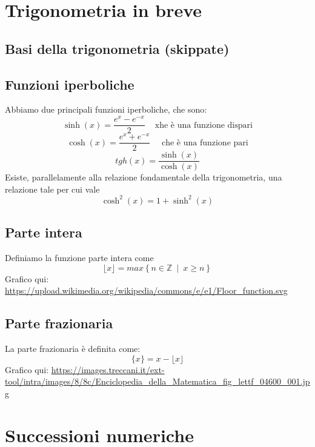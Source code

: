 \documentclass{article}
\theoremstyle{definition}
\begin{document}
\section{Trigonometria in breve}
\subsection{Basi della trigonometria (skippate)}
\subsection{Funzioni iperboliche}
Abbiamo due principali funzioni iperboliche, che sono:
\begin{equation}
    \sinh(x)=\frac{e^x-e^{-x}}{2} \,\,\,\,\,\,\, \mbox{xhe è una funzione dispari}
\end{equation}
\begin{equation}
    \cosh(x)=\frac{e^x+e^{-x}}{2}\,\,\,\,\,\,\,\, \mbox{che è una funzione pari}
\end{equation}
\begin{equation}
    tgh(x)=\frac{\sinh(x)}{\cosh(x)}
\end{equation}
Esiste, parallelamente alla relazione fondamentale della trigonometria, una relazione tale per cui vale
\begin{equation}
    \cosh^2(x)=1+\sinh^2(x)
\end{equation}
\subsection{Parte intera}
Definiamo la funzione parte intera come
\begin{equation}
    \lfloor x \rfloor = max\left\{n \in \mathbb{Z} \,\,\, | \,\,\, x \geqslant n\right\}
\end{equation}
Grafico qui: \url{https://upload.wikimedia.org/wikipedia/commons/e/e1/Floor_function.svg}


\subsection{Parte frazionaria}
La parte frazionaria è definita come:
\begin{equation}
    \{x\}=x-\lfloor x \rfloor 
\end{equation}
Grafico qui: \url{https://images.treccani.it/ext-tool/intra/images/8/8c/Enciclopedia_della_Matematica_fig_lettf_04600_001.jpg}


\newpage
\section{Successioni numeriche}
\end{document}

